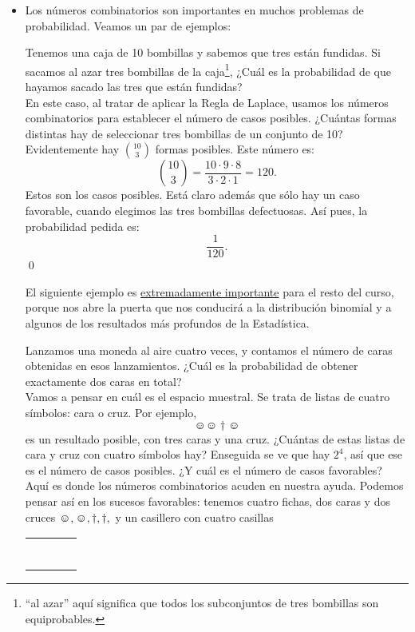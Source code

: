 \begin{itemize}
    \item Los números combinatorios son importantes en muchos problemas de probabilidad. Veamos un par de ejemplos:
        \begin{Ejemplo}
        Tenemos una caja de 10 bombillas y sabemos que tres están fundidas. Si sacamos al azar tres bombillas de la caja\footnote{``al azar'' aquí significa que todos los subconjuntos de tres bombillas son equiprobables.}, ¿Cuál es la probabilidad de que hayamos sacado las tres que están fundidas?\\[2mm]
        En este caso, al tratar de aplicar la Regla de Laplace, usamos los números combinatorios para establecer el número de casos posibles. ¿Cuántas formas distintas hay de seleccionar tres bombillas de un conjunto de 10? Evidentemente hay $\binom{10}{3}$ formas posibles. Este número es:
        \[\binom{10}{3}=\dfrac{10\cdot 9\cdot 8}{3\cdot 2\cdot 1}=120.\]
        Estos son los casos posibles. Está claro además que sólo hay un caso favorable, cuando elegimos las tres bombillas defectuosas. Así pues, la probabilidad pedida es:
        \[\dfrac{1}{120}.\]
        \qed
        \end{Ejemplo}
        El siguiente ejemplo es \underline{extremadamente importante} para el resto del curso, porque nos abre la puerta que nos conducirá a la distribución binomial y a algunos de los resultados más profundos de la Estadística.
        \begin{Ejemplo}\label{ejem:probabilidadLanzamientoMonedas}
        Lanzamos una moneda al aire cuatro veces, y contamos el número de caras obtenidas en esos lanzamientos. ¿Cuál es la probabilidad de obtener exactamente dos caras en total?\\
        Vamos a pensar en cuál es el espacio muestral. Se trata de listas de cuatro símbolos: cara o cruz. Por ejemplo,
        \[\smiley\smiley\dagger\smiley\]
        es un resultado posible, con tres caras y una cruz. ¿Cuántas de estas listas de cara y cruz con cuatro símbolos hay? Enseguida se ve que hay $2^4$, así que ese es el número de casos posibles. ¿Y cuál es el número de casos favorables? Aquí es donde los números combinatorios acuden en nuestra ayuda. Podemos pensar así en los sucesos favorables: tenemos cuatro fichas, dos caras y dos cruces $\smiley,\smiley,\dagger,\dagger,$ y un casillero con cuatro casillas
        \begin{center}
        \begin{tabular}{|c|c|c|c|}
        \hline
         \rule{0cm}{0.5cm}\rule{1cm}{0cm}&\rule{1cm}{0cm}&\rule{1cm}{0cm} &\rule{1cm}{0cm}\\

\end{tabular}
\end{center}
\end{Ejemplo}
\end{itemize}
